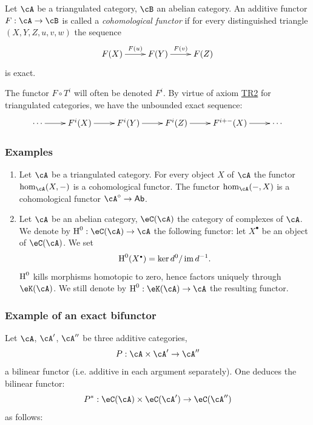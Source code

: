 \begin{definition}
Let $\cA$ be a triangulated category, $\cB$ an abelian category.
An additive functor $F:\cA\to \cB$ is called a \emph{cohomological functor} if
for every distinguished triangle $(X,Y,Z,u,v,w)$ the sequence 
\[\xymatrix{
  F(X) \ar[r]^-{F(u)} 
    & F(Y) \ar[r]^-{F(v)} 
    & F(Z) 
}\]
is exact.
\end{definition}

The functor $F\circ T^i$ will often be denoted $F^i$. By virtue of axiom
\hyperlink{VIII:TR2}{TR2} for triangulated categories, we have the
unbounded exact sequence: 
\[\xymatrix{
  \cdots \ar[r] 
    & F^i(X) \ar[r] 
    & F^i(Y) \ar[r] 
    & F^i(Z) \ar[r] 
    & F^{i+-}(X) \ar[r] 
    & \cdots 
}\]





\subsubsection{Examples}\label{VIII:1-3-2}

\begin{enumerate}
  \item Let $\cA$ be a triangulated category. For every object $X$ of $\cA$
    the functor $\hom_\cA(X,-)$ is a cohomological functor. The functor
    $\hom_\cA(-,X)$ is a cohomological functor $\cA^\circ\to\mathsf{Ab}$.
  \item Let $\cA$ be an abelian category, $\eC(\cA)$ the category of
    complexes of $\cA$. We denote by $\h^0:\eC(\cA)\to\cA$ the following
    functor: let $X^\bullet$ be an object of $\eC(\cA)$. We set
    \[
      \h^0(X^\bullet) = \ker d^0 / \im{d^{-1}} \text{.}
    \]
    $\operatorname{H}^0$ kills morphisms homotopic to zero, hence factors uniquely
    through $\eK(\cA)$. We still denote by
    $\h^0:\eK(\cA) \to \cA$ the resulting functor.
\end{enumerate}





\subsubsection{Example of an exact bifunctor}\label{VIII:1-3-3}

Let $\cA$, $\cA'$, $\cA''$ be three additive categories,
\[
  P:\cA\times \cA'\to \cA''
\]
a bilinear functor (i.e. additive in each argument
separately). One deduces the bilinear functor:
\[
  P^\ast:\eC(\cA)\times \eC(\cA') \to \eC(\cA'')
\]
as follows:

